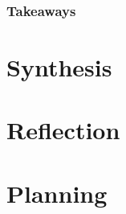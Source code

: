 \documentclass[
	letterpaper, %
]{jdf}
\begin{document}
\subsubsection{Takeaways}
\section{Synthesis}


\section{Reflection}


\section{Planning}


\printbibliography{}
\end{document}
